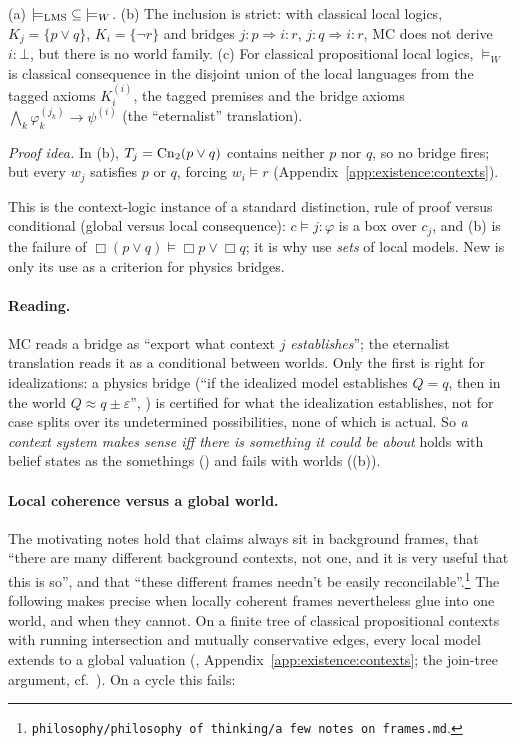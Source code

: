 \begin{theorem}\label{thm:existence:rules}
\textup{(a)} ${\models_{\mathrm{LMS}}}\subseteq{\models_W}$. \textup{(b)} The inclusion is strict: with classical local logics, $K_j=\{p\vee q\}$, $K_i=\{\neg r\}$ and bridges $j{:}p\Rightarrow i{:}r$, $j{:}q\Rightarrow i{:}r$, MC does not derive $i{:}\bot$, but there is no world family. \textup{(c)} For classical propositional local logics, $\models_W$ is classical consequence in the disjoint union of the local languages from the tagged axioms $K_i^{(i)}$, the tagged premises and the bridge axioms $\bigwedge_k\varphi_k^{(j_k)}\to\psi^{(i)}$ (the ``eternalist'' translation).
\end{theorem}

\emph{Proof idea.} In (b), $T_j=\mathrm{Cn}_2(p\vee q)$ contains neither $p$ nor $q$, so no bridge fires; but every $w_j$ satisfies $p$ or $q$, forcing $w_i\models r$ (Appendix~\ref{app:existence:contexts}).

This is the context-logic instance of a standard distinction, rule of proof versus conditional (global versus local consequence): $c\models j{:}\varphi$ is a box over $c_j$, and (b) is the failure of $\Box(p\vee q)\models\Box p\vee\Box q$; it is why \citet{ghidini2001local} use \emph{sets} of local models. New is only its use as a criterion for physics bridges.

\paragraph{Reading.} MC reads a bridge as ``export what context $j$ \emph{establishes}''; the eternalist translation reads it as a conditional between worlds. Only the first is right for idealizations: a physics bridge (``if the idealized model establishes $Q=q$, then in the world $Q\approx q\pm\varepsilon$'', ) is certified for what the idealization establishes, not for case splits over its undetermined possibilities, none of which is actual. So \emph{a context system makes sense iff there is something it could be about} holds with belief states as the somethings () and fails with worlds ((b)).

\paragraph{Local coherence versus a global world.} The motivating notes hold that claims always sit in background frames, that ``there are many different background contexts, not one, and it is very useful that this is so'', and that ``these different frames needn't be easily reconcilable''.\footnote{\texttt{philosophy/philosophy of thinking/a few notes on frames.md}.} The following makes precise when locally coherent frames nevertheless glue into one world, and when they cannot. On a finite tree of classical propositional contexts with running intersection and mutually conservative edges, every local model extends to a global valuation (, Appendix~\ref{app:existence:contexts}; the join-tree argument, cf.\ \citealt{beeri1983desirability}). On a cycle this fails:

